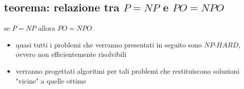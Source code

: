 \subsection*{teorema: relazione tra $P=NP$ e $PO=NPO$} 
\begin{flushleft}
	se $P=NP$ allora $PO=NPO$
	\begin{itemize}
		\item quasi tutti i problemi che verranno presentati in seguito sono $NP\text{-}HARD$, ovvero non efficientemente risolvibili
		\item verranno progettati algoritmi per tali problemi che restituiscono soluzioni "vicine" a quelle ottime
	\end{itemize}
\end{flushleft}


\newpage
